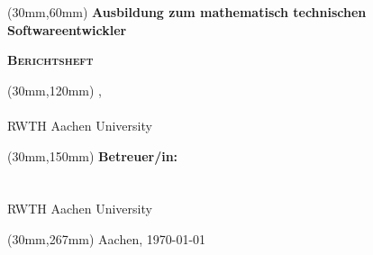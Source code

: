 \begin{titlepage}
	\begin{textblock*}{\textwidth}(30mm,60mm)
		\centering
		{\large\bfseries Ausbildung zum mathematisch technischen Softwareentwickler} \\[3ex]
		\begin{huge}\bfseries\scshape Berichtsheft\par\end{huge}
	\end{textblock*}
	\vspace*{85mm}
	\centering\large
	\begin{textblock*}{\textwidth}(30mm,120mm)
		\centering
		\Nachname, \Vorname\\
		{\small \Institut}\\
		{\small RWTH Aachen	University}\\
	\end{textblock*}
	\begin{textblock*}{\textwidth}(30mm,150mm)
		\centering
		{\small\textbf{Betreuer/in:}}\\
		\Betreuer\\
		{\small \Institut}\\
		{\small RWTH Aachen	University}\\
	\end{textblock*}
	\begin{textblock*}{\textwidth}(30mm,267mm)
		\centering\large Aachen, \today
	\end{textblock*}
	
\end{titlepage}